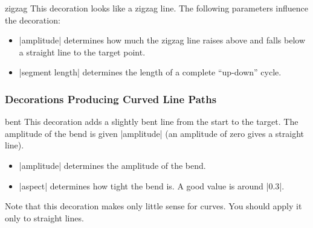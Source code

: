 \begin{decoration}{zigzag}
    This decoration looks like a zigzag line. The following parameters
    influence the decoration:
    \begin{itemize}
        \item |amplitude| determines how much the zigzag line raises above and
            falls below a straight line to the target point.
        \item |segment length| determines the length of a complete ``up-down''
            cycle.
    \end{itemize}
\begin{codeexample}[preamble={\usetikzlibrary{decorations.pathmorphing}}]
\end{codeexample}
\end{decoration}


\subsubsection{Decorations Producing Curved Line Paths}

\begin{decoration}{bent}
    This decoration adds a slightly bent line from the start to the target. The
    amplitude of the bend is given |amplitude| (an amplitude of zero gives a
    straight line).
    \begin{itemize}
        \item |amplitude| determines the amplitude of the bend.
        \item |aspect| determines how tight the bend is. A good value is around
            |0.3|.
    \end{itemize}
    Note that this decoration makes only little sense for curves. You should
    apply it only to straight lines.
\begin{codeexample}[preamble={\usetikzlibrary{decorations.pathmorphing}}]
\end{codeexample}
\begin{codeexample}[preamble={\usetikzlibrary{decorations.pathmorphing}}]
\end{codeexample}
\end{decoration}

